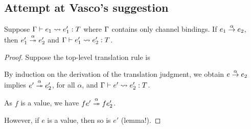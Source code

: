 \subsection{Attempt at Vasco's suggestion}
\label{sec:attempt-at-vascos}

\begin{lemma}
  Suppose $\Ctxt \vdash e_1 \leadsto e'_1 : T$ where $\Ctxt$ contains
  only channel bindings.  If
  $\reduce[\alpha]{e_1}{e_2}$, then $\reducemany[\alpha]{e'_1}{e'_2}$
  and $\Ctxt \vdash e'_1 \leadsto e'_2 : T$.
\end{lemma}
\begin{proof}
  Suppose the top-level translation rule is
  \begin{mathpar}
  \end{mathpar}
  By induction on the derivation of the translation judgment, we
  obtain
  $\reduce[\alpha]{e}{e_2}$ implies $\reducemany[\alpha]{e'}{e'_2}$,
  for all $\alpha$, and $\Ctxt \vdash e' \leadsto e'_2 : T$.

  As $f$ is a value, we have $\reducemany[\alpha]{f e'}{f e'_2}$.

  However, if $e$ is a value, then so is $e'$ (lemma!). 

  
\end{proof}

